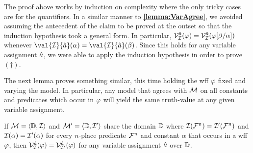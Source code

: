 The proof above works by induction on complexity where the only tricky cases are for the quantifiers.
In a similar manner to \textbf{\ref{lemma:VarAgree}}, we avoided assuming the antecedent of the claim to be proved at the outset so that the induction hypothesis took a general form.
In particular, $\mathcal{V}_{\mathcal{I}}^{\hat{a}}(\varphi)=\mathcal{V}_{\mathcal{I}}^{\hat{a}}(\varphi[\beta/\alpha])$ whenever $\val{\I}{\va{a}}(\alpha)=\val{\I}{\va{a}}(\beta)$.
Since this holds for any variable assignment $\hat{a}$, we were able to apply the induction hypothesis in order to prove $(\dagger)$.

The next lemma proves something similar, this time holding the wff $\varphi$ fixed and varying the model. 
In particular, any model that agrees with $\mathcal{M}$ on all constants and predicates which occur in $\varphi$ will yield the same truth-value at any given variable assignment. 

\begin{Lthm} \label{lemma:model}
  If $\mathcal{M}=\langle\mathbb{D},\mathcal{I}\rangle$ and $\mathcal{M}'=\langle\mathbb{D},\mathcal{I}'\rangle$ share the domain $\mathbb{D}$ where $\mathcal{I}(\mathcal{F}^n)=\mathcal{I}'(\mathcal{F}^n)$ and $\mathcal{I}(\alpha)=\mathcal{I}'(\alpha)$ for every $n$-place predicate $\mathcal{F}^n$ and constant $\alpha$ that occurs in a wff $\varphi$, then $\mathcal{V}_{\mathcal{I}}^{\hat{a}}(\varphi)=\mathcal{V}_{\mathcal{I}'}^{\hat{a}}(\varphi)$ for any variable assignment $\hat{a}$ over $\mathbb{D}$.
\end{Lthm}

